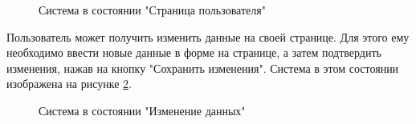 \begin{figure}[!htb]
	\caption{Система в состоянии "Страница пользователя"}
	\label{stestUserBefore:image}
\end{figure}


Пользователь может получить изменить данные на своей странице. Для этого ему необходимо ввести новые данные в форме на странице, а затем подтвердить изменения, нажав на кнопку "Сохранить изменения". Система в этом состоянии изображена на рисунке \ref{stestUserAfter:image}.

\begin{figure}[!htb]
	\caption{Система в состоянии "Изменение данных"}
	\label{stestUserAfter:image}
\end{figure}
\clearpage